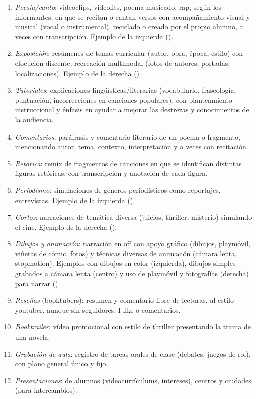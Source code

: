 \documentclass[spanish]{textolivre}
\begin{document}
\begin{enumerate}
 \item \textit{Poesía/canto}: videoclips, videolits, poema musicado, rap, según los informantes, en que se recitan o cantan versos con acompañamiento visual y musical (vocal o instrumental), reciclado o creado por el propio alumno, a veces con transcripción. Ejemplo de la izquierda ().
 \item \textit{Exposición}: resúmenes de temas curricular (autor, obra, época, estilo) con elocución discente, recreación multimodal (fotos de autores, portadas, localizaciones). Ejemplo de la derecha ()
 \item \textit{Tutoriales}: explicaciones lingüísticas/literarias (vocabulario, fraseología, puntuación, incorrecciones en canciones populares), con planteamiento instruccional y énfasis en ayudar a mejorar las destrezas y conocimientos de la audiencia.
 \item \textit{Comentarios}: paráfrasis y comentario literario de un poema o fragmento, mencionando autor, tema, contexto, interpretación y a veces con recitación.
 \item \textit{Retórica}: remix de fragmentos de canciones en que se identifican distintas figuras retóricas, con transcripción y anotación de cada figura.
 \item \textit{Periodismo}: simulaciones de géneros periodísticos como reportajes, entrevistas. Ejemplo de la izquierda ().
 \item \textit{Cortos}: narraciones de temática diversa (juicios, thriller, misterio) simulando el cine. Ejemplo de la derecha ().
 \item \textit{Dibujos y animación}: narración en off con apoyo gráfico (dibujos, playmóvil, viñetas de cómic, fotos) y técnicas diversas de animación (cámara lenta, stopmotion). Ejemplos con dibujos en color (izquierda), dibujos simples grabados a cámara lenta (centro) y uso de playmóvil y fotografías (derecha) para narrar ()
 \item \textit{Reseñas} (booktubers): resumen y comentario libre de lecturas, al estilo youtuber, aunque sin seguidores, I like o comentarios.
 \item \textit{Booktrailer}: vídeo promocional con estilo de thriller presentando la trama de una novela.
 \item \textit{Grabación de aula}: registro de tareas orales de clase (debates, juegos de rol), con plano general único y fijo.
 \item \textit{Presentaciones}: de alumnos (videocurrículums, intereses), centros y ciudades (para intercambios).
\end{enumerate}
\end{document}
